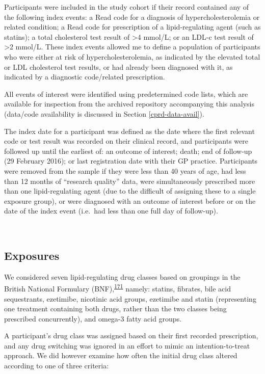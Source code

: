 \documentclass[a4paper, twoside]{templates/ociamthesis}
\begin{document}
Participants were included in the study cohort if their record contained any of the following index events: a Read code for a diagnosis of hypercholesterolemia or related condition; a Read code for prescription of a lipid-regulating agent (such as statins); a total cholesterol test result of \textgreater4 mmol/L; or an LDL-c test result of \textgreater2 mmol/L. These index events allowed me to define a population of participants who were either at risk of hypercholesterolemia, as indicated by the elevated total or LDL cholesterol test results, or had already been diagnosed with it, as indicated by a diagnostic code/related prescription.

All events of interest were identified using predetermined code lists, which are available for inspection from the archived repository accompanying this analysis (data/code availability is discussed in Section \ref{cprd-data-avail}).

The index date for a participant was defined as the date where the first relevant code or test result was recorded on their clinical record, and participants were followed up until the earliest of: an outcome of interest; death; end of follow-up (29 February 2016); or last registration date with their GP practice. Participants were removed from the sample if they were less than 40 years of age, had less than 12 months of ``research quality'' data, were simultaneously prescribed more than one lipid-regulating agent (due to the difficult of assigning these to a single exposure group), or were diagnosed with an outcome of interest before or on the date of the index event (i.e.~had less than one full day of follow-up).

~

\hypertarget{exposures}{%
\subsection{Exposures}\label{exposures}}

We considered seven lipid-regulating drug classes based on groupings in the British National Formulary (BNF),\textsuperscript{\protect\hyperlink{ref-wishart2017}{171}} namely: statins, fibrates, bile acid sequestrants, ezetimibe, nicotinic acid groups, ezetimibe and statin (representing one treatment containing both drugs, rather than the two classes being prescribed concurrently), and omega-3 fatty acid groups.

A participant's drug class was assigned based on their first recorded prescription, and any drug switching was ignored in an effort to mimic an intention-to-treat approach. We did however examine how often the initial drug class altered according to one of three criteria:
\end{document}
